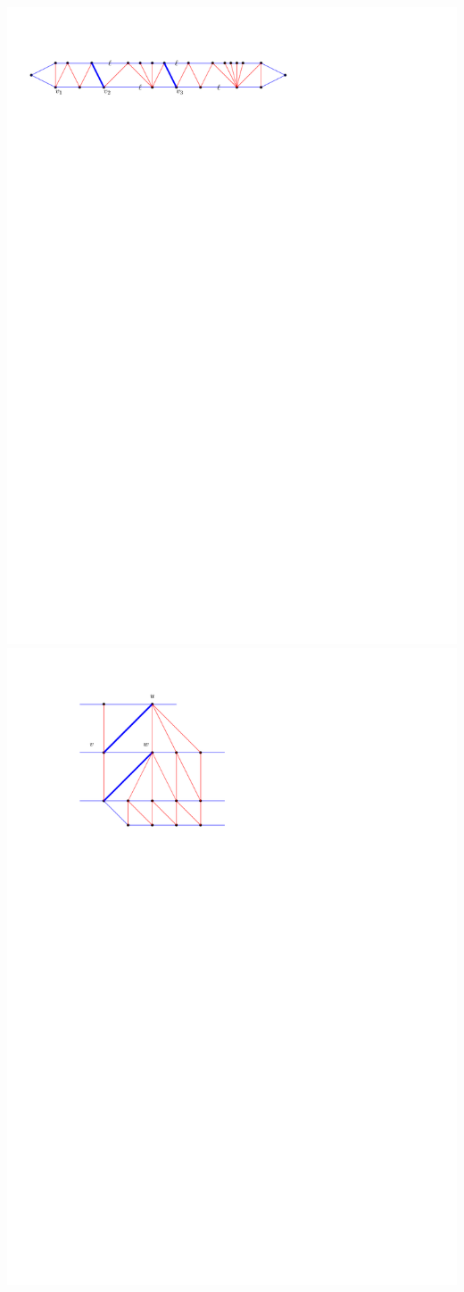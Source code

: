 \documentclass[a4paper]{article}
\begin{document}
\includegraphics[scale=1]{blueFaceSubdivision/img/sampleExecution}
\clearpage%
\includegraphics[scale=1]{./blueFaceSubdivision/img/forcedFlips.pdf}
\clearpage%
\end{document}
